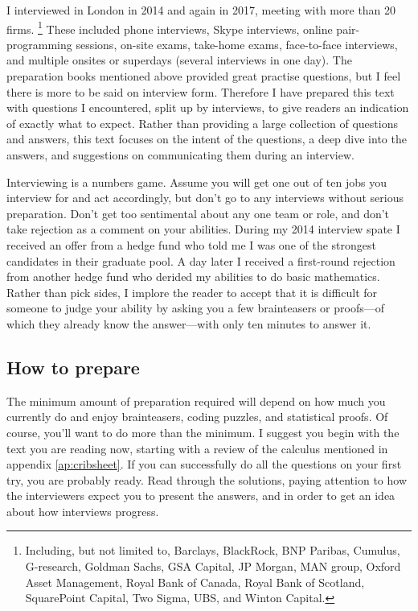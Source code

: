 \documentclass[a4paper]{article}
\begin{document}
I interviewed in London in 2014 and again in 2017,
meeting with more than 20 firms.%
\footnote{Including, but not limited to,
  Barclays,
  BlackRock,
  BNP Paribas,
  Cumulus,
  G-research,
  Goldman Sachs,
  GSA Capital,
  JP Morgan,
  MAN group,
  Oxford Asset Management,
  Royal Bank of Canada,
  Royal Bank of Scotland,
  SquarePoint Capital,
  Two Sigma,
  UBS,
and
  Winton Capital.
}
These included phone interviews, Skype interviews, online pair-programming sessions, on-site exams, take-home exams, face-to-face interviews, and multiple onsites or superdays (several interviews in one day).
The preparation books mentioned above provided great practise questions, but I feel there is more to be said on interview form.
Therefore I have prepared this text with questions I encountered, split up by interviews, to give readers an indication of exactly what to expect.
Rather than providing a large collection of questions and answers, this text focuses on the intent of the questions, a deep dive into the answers, and suggestions on communicating them during an interview.

Interviewing is a numbers game.
Assume you will get one out of ten jobs you interview for and act accordingly, but don't go to any interviews without serious preparation.
Don't get too sentimental about any one team or role, and don't take rejection as a comment on your abilities.
During my 2014 interview spate I received an offer from a hedge fund who told me I was one of the strongest candidates in their graduate pool.
A day later I received a first-round rejection from another hedge fund who derided my abilities to do basic mathematics.
Rather than pick sides, I implore the reader to accept that it is difficult for someone to judge your ability by asking you a few brainteasers or proofs---of which they already know the answer---with only ten minutes to answer it.

{}
\subsection*{How to prepare}

The minimum amount of preparation required will depend on how much you currently do and enjoy brainteasers, coding puzzles, and statistical proofs.
Of course, you'll want to do more than the minimum.
I suggest you begin with the text you are reading now, starting with a review of the calculus mentioned in appendix \ref{ap:cribsheet}.
If you can successfully do all the questions on your first try, you are probably ready.
Read through the solutions, paying attention to how the interviewers expect you to present the answers, and in order to get an idea about how interviews progress.
\end{document}
